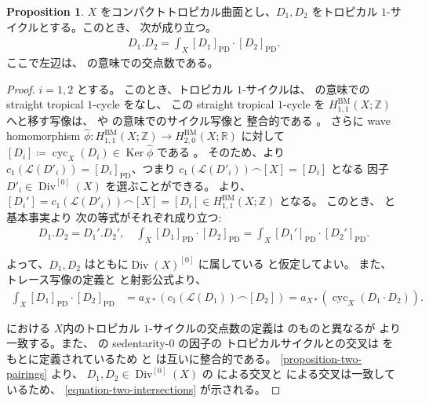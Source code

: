 \documentclass[a4paper,dvipdfmx,reqno,12pt]{amsart}
\theoremstyle{definition}
\newtheorem{proposition}[theorem]{Proposition}
\newcommand{\deq}{\coloneqq}
\newcommand{\opn}[1]{\operatorname{#1}}
\newcommand{\PD}[1]{[#1]_{\mathrm{PD}}}
\numberwithin{equation}{section}
\begin{document}
\begin{proposition}
\label{proposition-cycle-chern}
$X$ をコンパクトトロピカル曲面とし、$D_1,D_2$
をトロピカル $1$-サイクルとする。このとき、
次が成り立つ。
\begin{align}
\label{equation-two-intersections}
D_1 . D_2=\int_X \PD{D_1}\cdot \PD{D_2}.
\end{align}
ここで左辺は、
\cite{shaw2015tropical}
の意味での交点数である。
\end{proposition}
\begin{proof}
$i=1,2$ とする。
このとき、トロピカル $1$-サイクルは、
\cite[Definition 4.2]{MR3330789} の意味での
straight tropical $1$-cycle をなし、
この straight tropical $1$-cycle を
$H_{1,1}^{\mathrm{BM}}(X;\mathbb{Z})$
へと移す写像は、\cite{MR3894860} や
\cite{MR4637248} の意味でのサイクル写像と
整合的である \cite[Theorem 5.13]{MR4637248}。
さらに wave homomorphism 
$\hat{\phi}\colon 
H^{\mathrm{BM}}_{1,1}(X;\mathbb{Z})
\to H^{\mathrm{BM}}_{2,0}(X;\mathbb{R})$ に対して
$[D_i]\deq \opn{cyc}_X(D_i)\in \opn{Ker} \hat{\phi}$
である \cite[Theorem 5.4]{MR3330789}。
そのため、\cite[Lemma 5.13]{MR3894860}より
$c_1(\mathcal{L}(D'_i))=\PD{D_i}$、つまり
$c_1(\mathcal{L}(D'_i))\frown [X]=[D_i]$ となる
因子 $D'_i\in \opn{Div}^{[0]}(X)$ を選ぶことができる。
\cite[Proposition 5.12]{MR4637248}より、
$[D_i']=c_1(\mathcal{L}(D'_i))\frown [X]=[D_i]\in 
H_{1,1}^{\mathrm{BM}}(X;\mathbb{Z})$ 
となる。
このとき、
\cite[Proposition 3.34]{shaw2015tropical} と基本事実より
次の等式がそれぞれ成り立つ:
\begin{align}
D_1.D_2=D_1'.D_2', \quad 
\int_X \PD{D_1}\cdot \PD{D_2}
=\int_X \PD{D_1'}\cdot \PD{D_2'}.
\end{align}

よって、$D_1,D_2$ はともに$\opn{Div}(X)^{[0]}$ に属している
と仮定してよい。
また、トレース写像の定義と
\cite[Proposition 5.12]{MR4637248}と射影公式より、
\begin{align}
\int_X \PD{D_1}\cdot \PD{D_2}
&=a_{X*}(c_1(\mathcal{L}(D_1))\frown [D_2])
=a_{X*}(\opn{cyc}_X(D_1\cdot D_2)).
\end{align}

\cite{shaw2015tropical} における
$X$内のトロピカル
$1$-サイクルの交点数の定義は
\cite{shaw2011tropical} のものと異なるが
\cite[Theorem 3.1.7]{shaw2011tropical}
より一致する。また、
\cite[]{demedrano2023chern}
の sedentarity-$0$ の因子の
トロピカルサイクルとの交叉は \cite{shaw2011tropical}
をもとに定義されているため
\cite{demedrano2023chern} と
\cite{shaw2015tropical} は互いに整合的である。
\cref{proposition-two-pairings} より、
$D_1,D_2\in \opn{Div}^{[0]}(X)$ の
\cite{demedrano2023chern} による交叉と
\cite{MR4637248} による交叉は一致しているため、
\cref{equation-two-intersections} が示される。
\end{proof}
\end{document}
